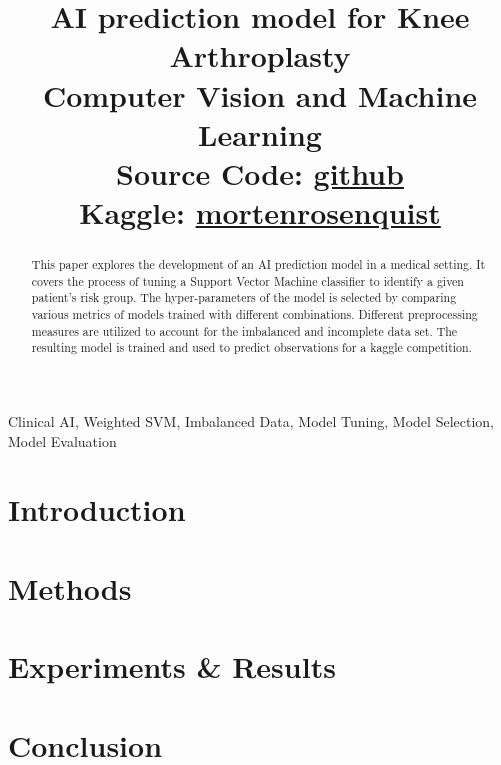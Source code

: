 \documentclass[conference]{IEEEtran}
\begin{document}
\title{AI prediction model for Knee Arthroplasty\\
{\LARGE Computer Vision and Machine Learning}\\
{\large Source Code: \href{https://github.com/mlRosenquist/au-mlr-computer-vision-and-ml/tree/master/project}{github}}\\
{\large Kaggle: \href{https://www.kaggle.com/mortenrosenquist} {mortenrosenquist}}
}

\author{
}

\maketitle
\thispagestyle{plain}
\pagestyle{plain}
\begin{abstract}
This paper explores the development of an AI prediction model in a medical setting. It covers the process of tuning a Support Vector Machine classifier to identify a given patient's risk group. The hyper-parameters of the model is selected by comparing various metrics of models trained with different combinations. Different preprocessing measures are utilized to account for the imbalanced and incomplete data set. The resulting model is trained and used to predict observations for a kaggle competition.
\end{abstract}

\begin{IEEEkeywords}
  Clinical AI, Weighted SVM, Imbalanced Data, Model Tuning, Model Selection, Model Evaluation
\end{IEEEkeywords}

\section{Introduction}


\section{Methods}


\section{Experiments \& Results}


\section{Conclusion}


\printbibliography[title={References}]
\end{document}
